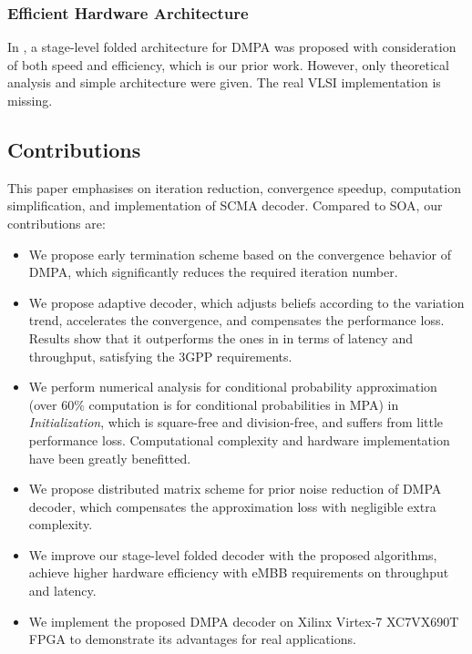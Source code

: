 \documentclass[journal,twoside]{IEEEtran}
\begin{document}
\subsubsection{Efficient Hardware Architecture}
In \cite{SCMA_archi}, a stage-level folded architecture for DMPA was proposed with consideration of both speed and efficiency, which is our prior work. However, only theoretical analysis and simple architecture were given. The real VLSI implementation is missing.

\subsection{Contributions}
This paper emphasises on iteration reduction, convergence speedup, computation simplification, and implementation of SCMA decoder. Compared to SOA, our contributions are:
\begin{itemize}
  \item We propose early termination scheme based on the convergence behavior of DMPA, which significantly reduces the required iteration number.
  \item We propose adaptive decoder, which adjusts beliefs according to the variation trend, accelerates the convergence, and compensates the performance loss. Results show that it outperforms the ones in \cite{SMPA_1,SMPA_2} in terms of latency and throughput, satisfying the 3GPP requirements.
  \item We perform numerical analysis for conditional probability approximation (over $60\%$ computation is for conditional probabilities in MPA) in \emph{Initialization}, which is square-free and division-free, and suffers from little performance loss. Computational complexity and hardware implementation have been greatly benefitted.
  \item We propose distributed matrix scheme for prior noise reduction of DMPA decoder, which compensates the approximation loss with negligible extra complexity.
  \item We improve our stage-level folded decoder with the proposed algorithms, achieve higher hardware efficiency with eMBB requirements on throughput and latency.
  \item We implement the proposed DMPA decoder on Xilinx Virtex-7 XC7VX690T FPGA to demonstrate its advantages for real applications.
\end{itemize}
\end{document}
